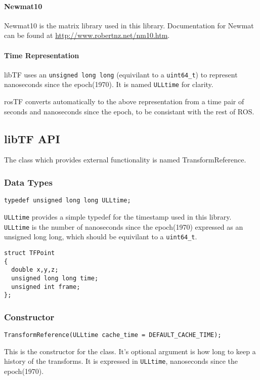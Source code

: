 \documentclass[12pt]{article}
\begin{document}
\paragraph {Newmat10}
Newmat10 is the matrix library used in this library.  Documentation for Newmat can be found at 
\url{http://www.robertnz.net/nm10.htm}.  

\paragraph {Time Representation}
libTF uses an \texttt{unsigned long long} (equivilant to a \texttt{uint64\_t}) to represent nanoseconds since the epoch(1970).  
It is named \texttt{ULLtime} for clarity.

rosTF converts automatically to the above representation from a time pair of seconds and nanoseconds since the epoch, to 
be consistant with the rest of ROS.  

\subsection{libTF API}
\label{libTFAPI}
The class which provides external functionality is named TransformReference.  

\subsubsection{Data Types}
\begin{verbatim}
typedef unsigned long long ULLtime;
\end{verbatim}

\texttt{ULLtime} provides a simple typedef for the timestamp used in this library. 
\texttt{ULLtime} is the number of nanoseconds since the epoch(1970) expressed as 
an unsigned long long, which should be equivilant to a \texttt{uint64\_t}. 

\begin{verbatim}
struct TFPoint
{
  double x,y,z;
  unsigned long long time;
  unsigned int frame;
};
\end{verbatim}


\subsubsection{Constructor}
\begin{verbatim}
TransformReference(ULLtime cache_time = DEFAULT_CACHE_TIME);
\end{verbatim}
This is the constructor for the class.  It's optional argument is 
how long to keep a history of the transforms.  It is expressed in 
\texttt{ULLtime}, nanoseconds since the epoch(1970).  
\end{document}

